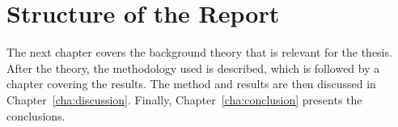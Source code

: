 \section{Structure of the Report}
\label{sec:structure}

The next chapter covers the background theory that is relevant for the thesis.
After the theory, the methodology used is described, which is followed by a chapter covering the results.
The method and results are then discussed in Chapter~\ref{cha:discussion}.
Finally, Chapter~\ref{cha:conclusion} presents the conclusions.
